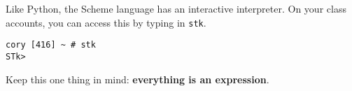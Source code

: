 Like Python, the Scheme language has an interactive
interpreter. On your class accounts, you can access this by typing in {\tt stk}.

\begin{verbatim}
cory [416] ~ # stk
STk>
\end{verbatim}

Keep this one thing in mind: \textbf{everything is an expression}.
